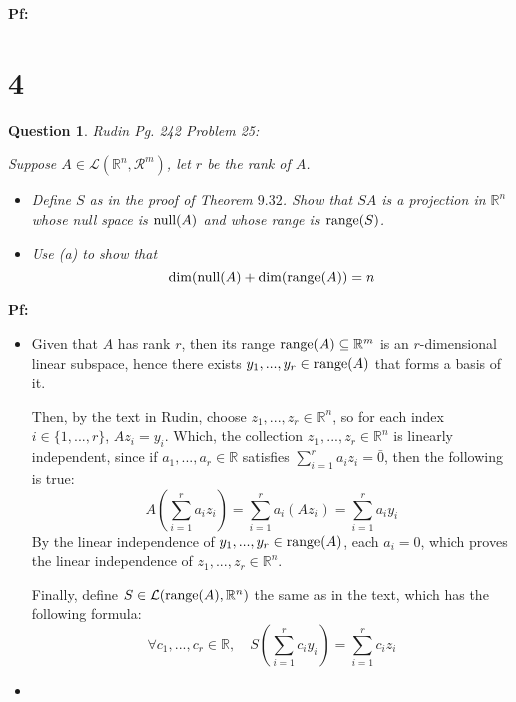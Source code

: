 \documentclass{article}
\newtheorem{question}{Question}
\begin{document}
\textbf{Pf:}

\break

\section*{4}
\begin{myBox}[]{}
    \begin{question}
        Rudin Pg. 242 Problem 25:

        Suppose $A\in\mathcal{L}(\mathbb{R}^n,\mathcal{R}^m)$, let $r$ be the rank of $A$.
        \begin{itemize}
            \item[(a)] Define $S$ as in the proof of Theorem $9.32$. Show that $SA$ is a projection in $\mathbb{R}^n$ whose null space is $\textmd{null}(A)$ and whose range is $\textmd{range}(S)$.
            \item[(b)] Use (a) to show that 
            $$\dim(\textmd{null}(A)+\dim(\textmd{range}(A))=n$$
        \end{itemize}
    \end{question}
\end{myBox}

\textbf{Pf:}
\begin{itemize}
    \item[(a)] Given that $A$ has rank $r$, then its range $\textmd{range}(A)\subseteq \mathbb{R}^m$ is an $r$-dimensional linear subspace, hence there exists $y_1,...,y_r\in \textmd{range}(A)$ that forms a basis of it.
    
    Then, by the text in Rudin, choose $z_1,...,z_r\in\mathbb{R}^n$, so for each index $i\in \{1,...,r\}$, $Az_i=y_i$. Which, the collection $z_1,...,z_r\in\mathbb{R}^n$ is linearly independent, since if $a_1,...,a_r\in\mathbb{R}$ satisfies $\sum_{i=1}^{r}a_iz_i = \bar{0}$, then the following is true:
    $$A\left(\sum_{i=1}^{r}a_iz_i\right) = \sum_{i=1}^{r}a_i(Az_i) = \sum_{i=1}^{r}a_iy_i$$
    By the linear independence of $y_1,...,y_r\in \textmd{range}(A)$, each $a_i = 0$, which proves the linear independence of $z_1,...,z_r\in\mathbb{R}^n$.

    Finally, define $S\in\mathcal{L}(\textmd{range}(A),\mathbb{R}^n)$ the same as in the text, which has the following formula:
    $$\forall c_1,...,c_r\in\mathbb{R},\quad S\left(\sum_{i=1}^{r}c_iy_i\right)=\sum_{i=1}^{r}c_iz_i$$
    \item[(b)] 
\end{itemize}

\break
\end{document}
